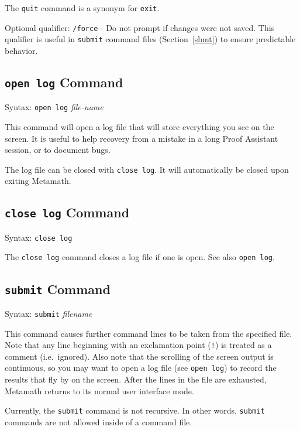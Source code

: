 The \texttt{quit} command is a synonym for \texttt{exit}.

Optional qualifier:
    \texttt{/force} - Do not prompt if changes were not saved.  This qualifier is
        useful in \texttt{submit} command files (Section~\ref{sbmt})
        to ensure predictable behavior.





\subsection{\texttt{open log} Command}
Syntax:  \texttt{open log} {\em file-name}

This command will open a log file that will store everything you see on
the screen.  It is useful to help recovery from a mistake in a long Proof
Assistant session, or to document bugs.

The log file can be closed with \texttt{close log}.  It will automatically be
closed upon exiting Metamath.



\subsection{\texttt{close log} Command}
Syntax:  \texttt{close log}

The \texttt{close log} command closes a log file if one is open.  See
also \texttt{open log}.




\subsection{\texttt{submit} Command}\label{sbmt}
Syntax:  \texttt{submit} {\em filename}

This command causes further command lines to be taken from the specified
file.  Note that any line beginning with an exclamation point (\texttt{!}) is
treated as a comment (i.e.\ ignored).  Also note that the scrolling
of the screen output is continuous, so you may want to open a log file
(see \texttt{open log}) to record the results that fly by on the screen.
After the lines in the file are exhausted, Metamath returns to its
normal user interface mode.

Currently, the \texttt{submit} command is not recursive.  In other words,
\texttt{submit} commands are not allowed inside of a command file.


